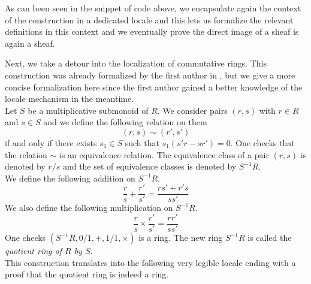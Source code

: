 \documentclass[12pt]{scrartcl}
\begin{document}
As can been seen in the snippet of code above, we encapsulate again the context of the construction in a dedicated locale and this lets us formalize the relevant definitions in this context and we eventually prove the direct image of a sheaf is again a sheaf. 

Next, we take a detour into the localization of commutative rings. This construction was already formalized by the first author in \cite{bordg18}, but we give a more concise formalization here since the first author gained a better knowledge of the locale mechanism in the meantime. \\
Let $S$ be a multiplicative submonoid of $R$. We consider pairs $(r, s)$ with $r \in R$ and $s \in S$ and we define the following relation on them
	\[
	(r, s) \sim (r', s')
	\]
if and only if there exists $s_1 \in S$ such that $s_1(s' r - s r') = 0$. One checks that the relation $\sim$ is an equivalence relation. The equivalence class of a pair $(r, s)$ is denoted by $r/s$ and the set of equivalence classes is denoted by $S^{-1} R$. \\
We define the following addition on $S^{-1} R$.
	\[
	\frac{r}{s} + \frac{r'}{s'} = \frac{r s' + r' s}{s s'}
	\]
We also define the following multiplication on $S^{-1} R$. 
	\[
	\frac{r}{s} \times \frac{r'}{s'} = \frac{r r'}{s s'}
	\]
One checks $(S^{-1} R, 0/1, +, 1/1, \times)$ is a ring. The new ring $S^{-1} R$ is called the \emph{quotient ring of $R$ by $S$}. \\
This construction translates into the following very legible locale ending with a proof that the quotient ring is indeed a ring.

\end{document}
